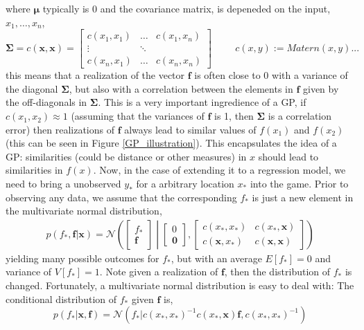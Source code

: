 where $\bm{\mu}$ typically is $0$ and the covariance matrix, is depeneded on the input, $x_1, \dots, x_n$, 
 $$\bm{\Sigma} = c(\textbf{x}, \textbf{x}) = \begin{bmatrix}
    c(x_1,x_1) & \dots & c(x_1,x_n)\\
    \vdots& \ddots\\
    c(x_n,x_1) & \dots & c(x_n,x_n) \end{bmatrix}\hspace{1cm} c(x, y) := Matern(x,y)...$$ this means
that a realization of the vector $\textbf{f}$ is often close to 0 with a variance of the diagonal
$\bm{\Sigma}$, but also with a correlation between the elements in $\textbf{f}$
given by the off-diagonals in $\bm{\Sigma}$. This is a very important ingredience of a GP, if
$c(x_1,x_2) \approx 1$ (assuming that the variances of $\textbf{f}$ is 1, then $\bm{\Sigma}$ is a
correlation error) then realizations of $\textbf{f}$ always lead to similar values of $f(x_1)$ and
$f(x_2)$ (this can be seen in Figure \ref{GP_illustration}). This encapsulates the idea of a GP: similarities
(could be distance or other measures) in $x$ should lead to similarities in $f(x)$. Now, in the case
of extending it to a regression model, we need to bring a unobserved $y_*$ for a arbitrary location
$x_*$ into the game. Prior to observing any data, we assume that the corresponding $f_*$ is
just a new element in the multivariate normal distribution, 
\begin{align}
    p(f_*,\textbf{f}|\textbf{x}) = \mathcal{N}\left(\begin{bmatrix}
        f_*\\ \textbf{f}
    \end{bmatrix} \middle| \begin{bmatrix}
        0\\ \textbf{0}
    \end{bmatrix}, \begin{bmatrix}
        c(x_*, x_*) & c(x_*,\textbf{x})\\
        c(\textbf{x}, x_*) & c(\textbf{x}, \textbf{x})
    \end{bmatrix} \right)
\end{align}
yielding many possible outcomes for $f_*$, but with an average $E[f_*] = 0$ and variance of $V[f_*]
= 1$. Note given a realization of $\textbf{f}$, then the distribution of $f_*$ is changed.
Fortunately, a multivariate normal distribution is easy to deal with: The conditional
distribution of $f_*$ given $\textbf{f}$ is, 
$$p(f_*|\textbf{x}, \textbf{f}) = \mathcal{N}(f_*|c(x_*, x_*)^{-1}c(x_*, \textbf{x})\textbf{f}, c(x_*, x_*)^{-1})$$
